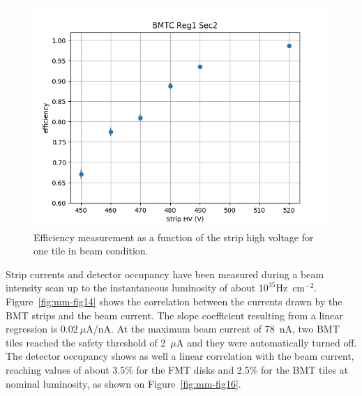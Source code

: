 \begin{figure}[htb]
 \includegraphics[width=1.0\columnwidth,keepaspectratio]{images/hvscan_BMTC_R1_S2.png}
 \caption{Efficiency measurement as a function of the strip high voltage for one tile in beam condition.}
 \label{fig:mm-eff_scan}
\end{figure}

 Strip currents and detector occupancy have been measured during a beam intensity scan up to the instantaneous luminosity of about $10^{35}$Hz~cm$^{-2}$. Figure~\ref{fig:mm-fig14} shows the correlation between the currents drawn by the BMT strips and the beam current. The slope coefficient resulting from a linear regression is $0.02~\mu$A/nA. At the maximum beam current of 78~nA, two BMT tiles reached the safety threshold of 2~$\mu$A and they were automatically turned off. The detector occupancy shows as well a linear correlation with the beam current, reaching values of about 3.5\% for the FMT disks and 2.5\% for the BMT tiles at nominal luminosity, as shown on Figure~\ref{fig:mm-fig16}.

